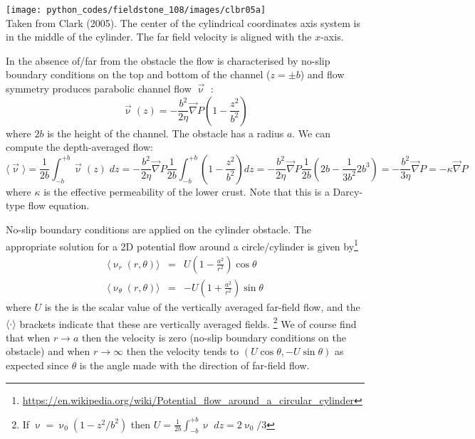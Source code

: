 \begin{center}
\texttt{[image: python\_codes/fieldstone\_108/images/clbr05a]}\\
{\captionfont 
Taken from Clark \etal (2005). The center of the cylindrical coordinates axis system is in the middle of the cylinder.  
The far field velocity is aligned with the $x$-axis.}
\end{center}

In the absence of/far from the obstacle the flow is characterised by no-slip boundary conditions 
on the top and bottom of the channel ($z=\pm b$) and flow symmetry produces parabolic channel flow $\vec\upnu$ :
\begin{equation}
\vec\upnu(z) = -\frac{b^2}{2\eta} \vec\nabla P \left( 1 - \frac{z^2}{b^2} \right)
\end{equation}
where $2b$ is the height of the channel. The obstacle has a radius $a$. We can compute the depth-averaged flow:
\begin{equation}
\langle \vec\upnu \rangle = \frac{1}{2b} \int_{-b}^{+b} \vec\upnu(z) \; dz 
=-\frac{b^2}{2\eta} \vec\nabla P \frac{1}{2b} 
\int_{-b}^{+b}   \left( 1 - \frac{z^2}{b^2} \right) dz
= -\frac{b^2}{2\eta} \vec\nabla P \frac{1}{2b} 
\left( 2b - \frac{1}{3b^2} 2b^3 \right)
= - \frac{b^2}{3\eta} \vec\nabla P 
= -\kappa \vec\nabla P
\label{eq:velo_para}
\end{equation}
where $\kappa$ is the effective permeability of the lower crust. 
Note that this is a Darcy-type flow equation.

No-slip boundary conditions are applied on the cylinder obstacle.
The appropriate solution for a 2D potential flow around a circle/cylinder is given by\footnote{\url{https://en.wikipedia.org/wiki/Potential_flow_around_a_circular_cylinder}}
\begin{eqnarray}
\langle\upnu_r(r,\theta)\rangle &=& U \left(1 -\frac{a^2}{r^2} \right) \cos \theta \label{eq:velo_para2}\\
\langle\upnu_\theta(r,\theta)\rangle &=& -U \left(1 +\frac{a^2}{r^2} \right) \sin \theta \label{eq:velo_para3}
\end{eqnarray}
where $U$ is the is the scalar value of the vertically averaged far-field flow, and the $\langle \cdot \rangle$
brackets indicate that these are vertically averaged fields.
\footnote{
If $\upnu = \upnu_0 (1-z^2/b^2)$ then 
$U=\frac{1}{2b} \int_{-b}^{+b} \upnu \; dz = 2\upnu_0/3$}
We of course find that when $r\rightarrow a$ then the velocity is zero 
(no-slip boundary conditions on the obstacle) and when $r\rightarrow \infty$ then the velocity tends to 
$(U \cos\theta, -U \sin\theta)$ as expected since $\theta$ is the angle made with the direction of far-field flow. 

